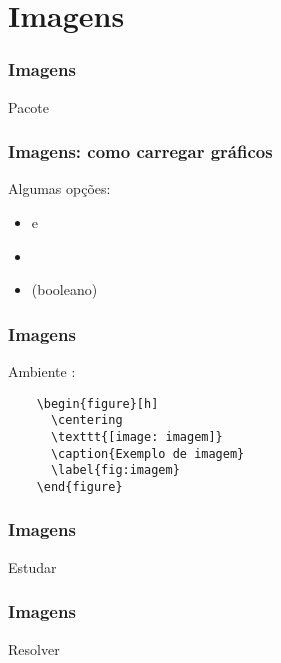 \section{Imagens}

\begin{frame}
  \frametitle{Imagens}
  \LARGE
  Pacote 
\end{frame}

\begin{frame}[fragile]
  \frametitle{Imagens: como carregar gráficos}
  \Large
  \vspace{1em}

  Algumas opções:
  \begin{itemize}
    \item {} e 
    \item {}
    \item {} (booleano)
  \end{itemize}
\end{frame}

\begin{frame}[fragile]
  \frametitle{Imagens}
  \Large
  Ambiente :

    \begin{verbatim}
    \begin{figure}[h]
      \centering
      \texttt{[image: imagem]}
      \caption{Exemplo de imagem}
      \label{fig:imagem}
    \end{figure}
    \end{verbatim}
\end{frame}

\begin{frame}
  \frametitle{Imagens}
  \Huge
  Estudar 
\end{frame}

\begin{frame}
  \frametitle{Imagens}
  \Huge
  Resolver 
\end{frame}
